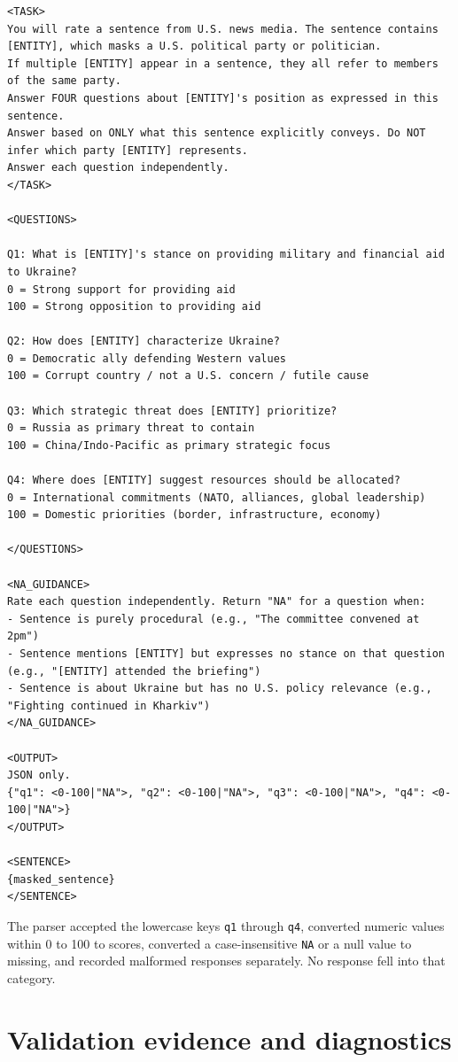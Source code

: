 \begin{lstlisting}
<TASK>
You will rate a sentence from U.S. news media. The sentence contains [ENTITY], which masks a U.S. political party or politician.
If multiple [ENTITY] appear in a sentence, they all refer to members of the same party.
Answer FOUR questions about [ENTITY]'s position as expressed in this sentence.
Answer based on ONLY what this sentence explicitly conveys. Do NOT infer which party [ENTITY] represents.
Answer each question independently.
</TASK>

<QUESTIONS>

Q1: What is [ENTITY]'s stance on providing military and financial aid to Ukraine?
0 = Strong support for providing aid
100 = Strong opposition to providing aid

Q2: How does [ENTITY] characterize Ukraine?
0 = Democratic ally defending Western values
100 = Corrupt country / not a U.S. concern / futile cause

Q3: Which strategic threat does [ENTITY] prioritize?
0 = Russia as primary threat to contain
100 = China/Indo-Pacific as primary strategic focus

Q4: Where does [ENTITY] suggest resources should be allocated?
0 = International commitments (NATO, alliances, global leadership)
100 = Domestic priorities (border, infrastructure, economy)

</QUESTIONS>

<NA_GUIDANCE>
Rate each question independently. Return "NA" for a question when:
- Sentence is purely procedural (e.g., "The committee convened at 2pm")
- Sentence mentions [ENTITY] but expresses no stance on that question (e.g., "[ENTITY] attended the briefing")
- Sentence is about Ukraine but has no U.S. policy relevance (e.g., "Fighting continued in Kharkiv")
</NA_GUIDANCE>

<OUTPUT>
JSON only.
{"q1": <0-100|"NA">, "q2": <0-100|"NA">, "q3": <0-100|"NA">, "q4": <0-100|"NA">}
</OUTPUT>

<SENTENCE>
{masked_sentence}
</SENTENCE>
\end{lstlisting}

The parser accepted the lowercase keys \texttt{q1} through \texttt{q4}, converted numeric values within 0 to 100 to scores, converted a case-insensitive \texttt{NA} or a null value to missing, and recorded malformed responses separately. No response fell into that category.

\section{Validation evidence and diagnostics}

